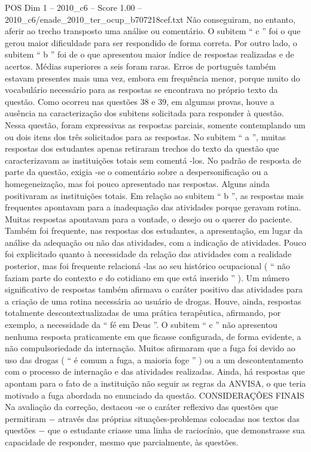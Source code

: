 \begin{textsample}{POS Dim 1 – 2010\_c6 – Score 1.00 – 2010\_c6/enade\_2010\_ter\_ocup\_b707218cef.txt}
Não conseguiram, no entanto, aferir ao trecho transposto uma análise ou comentário.
O subitem “ c ” foi o que gerou maior dificuldade para ser respondido de forma correta.
Por outro lado, o subitem “ b ” foi de o que apresentou maior índice de respostas realizadas e de acertos.
Médias superiores a seis foram raras.
Erros de português também estavam presentes mais uma vez, embora em frequência menor, porque muito do vocabulário necessário para as respostas se encontrava no próprio texto da questão.
Como ocorreu nas questões 38 e 39, em algumas provas, houve a ausência na caracterização dos subitens solicitada para responder à questão.
Nessa questão, foram expressivas as respostas parciais, somente contemplando um ou dois itens dos três solicitados para as respostas.
No subitem “ a ”, muitas respostas dos estudantes apenas retiraram trechos do texto da questão que caracterizavam as instituições totais sem comentá -los.
No padrão de resposta de parte da questão, exigia -se o comentário sobre a despersonificação ou a homegeneização, mas foi pouco apresentado nas respostas.
Alguns ainda positivaram as instituições totais.
Em relação ao subitem “ b ”, as respostas mais frequentes apontavam para a inadequação das atividades porque geravam rotina.
Muitas respostas apontavam para a vontade, o desejo ou o querer do paciente.
Também foi frequente, nas respostas dos estudantes, a apresentação, em lugar da análise da adequação ou não das atividades, com a indicação de atividades.
Pouco foi explicitado quanto à necessidade da relação das atividades com a realidade posterior, mas foi frequente relacioná -las ao seu histórico ocupacional ( “ não faziam parte do contexto e do cotidiano em que está inserido ” ).
Um número significativo de respostas também afirmava o caráter positivo das atividades para a criação de uma rotina necessária ao usuário de drogas.
Houve, ainda, respostas totalmente descontextualizadas de uma prática terapêutica, afirmando, por exemplo, a necessidade da “ fé em Deus ”.
O subitem “ c ” não apresentou nenhuma resposta praticamente em que ficasse configurada, de forma evidente, a não compulsoriedade da internação.
Muitos afirmaram que a fuga foi devido ao uso das drogas ( “ é comum a fuga, a maioria foge ” ) ou a um descontentamento com o processo de internação e das atividades realizadas.
Ainda, há respostas que apontam para o fato de a instituição não seguir as regras da ANVISA, o que teria motivado a fuga abordada no enunciado da questão.
CONSIDERAÇÕES FINAIS Na avaliação da correção, destacou -se o caráter reflexivo das questões que permitiram − através das próprias situações-problemas colocadas nos textos das questões − que o estudante criasse uma linha de raciocínio, que demonstrasse sua capacidade de responder, mesmo que parcialmente, às questões.

\end{textsample}
